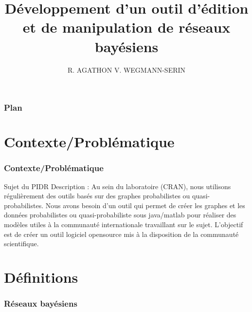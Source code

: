 \documentclass{beamer}
\title[PIDR]{Développement d’un outil d’édition et de manipulation de réseaux bayésiens} %
\author{R. AGATHON V. WEGMANN-SERIN} %
{

}
\begin{document}
\begin{frame}
\titlepage %
\end{frame}

\begin{frame}
\frametitle{Plan} %
\tableofcontents %
\end{frame}


\section{Contexte/Problématique}

\begin{frame}
\frametitle{Contexte/Problématique}
\begin{block}{Sujet du PIDR}
Description : Au sein du laboratoire (CRAN), nous utilisons régulièrement des outils basés sur des
graphes probabilistes ou quasi-probabilistes. Nous avons besoin d’un outil qui permet de créer les
graphes et les données probabilistes ou quasi-probabiliste sous java/matlab pour réaliser des modèles
utiles à la communauté internationale travaillant sur le sujet. L’objectif est de créer un outil logiciel opensource
mis à la disposition de la communauté scientifique.
\end{block}

\end{frame}


\section{Définitions}

\begin{frame}
\frametitle{Réseaux bayésiens}
\end{frame}
\end{document}
